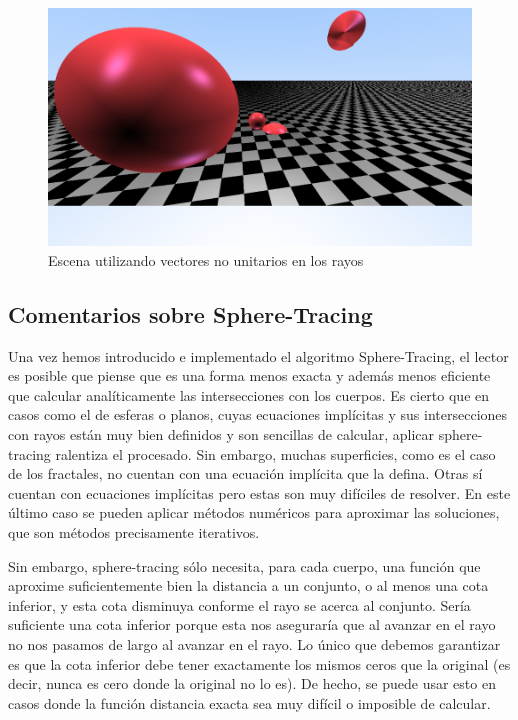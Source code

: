 \begin{figure} [ht]
    \centering
    \includegraphics[scale = 0.3]{img/C8/vectores-no-normalizados.png}
    \caption{Escena utilizando vectores no unitarios en los rayos}
    \label{fig:vectores-no-normalizados}
\end{figure}

\subsection{Comentarios sobre Sphere-Tracing}
\label{subsection:comentarios}

Una vez hemos introducido e implementado el algoritmo Sphere-Tracing, el lector es posible que piense que es una forma menos exacta y además menos eficiente que calcular analíticamente las intersecciones con los cuerpos. Es cierto que en casos como el de esferas o planos, cuyas ecuaciones implícitas y sus intersecciones con rayos están muy bien definidos y son sencillas de calcular, aplicar sphere-tracing ralentiza el procesado. Sin embargo, muchas superficies, como es el caso de los fractales, no cuentan con una ecuación implícita que la defina. Otras sí cuentan con ecuaciones implícitas pero estas son muy difíciles de resolver. En este último caso se pueden aplicar métodos numéricos para aproximar las soluciones, que son métodos precisamente iterativos. 

Sin embargo, sphere-tracing sólo necesita, para cada cuerpo, una función que aproxime suficientemente bien la distancia a un conjunto, o al menos una cota inferior, y esta cota disminuya conforme el rayo se acerca al conjunto. Sería suficiente una cota inferior porque esta nos aseguraría que al avanzar en el rayo no nos pasamos de largo al avanzar en el rayo. Lo único que debemos garantizar es que la cota inferior debe tener exactamente los mismos ceros que la original (es decir, nunca es cero donde la original no lo es). De hecho, se puede usar esto en casos donde la función distancia exacta sea muy difícil o imposible de calcular.

